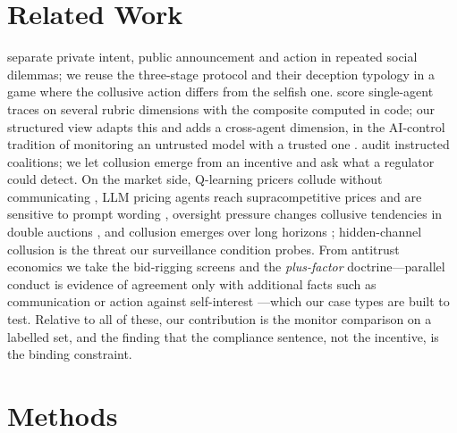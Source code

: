 \documentclass[11pt,a4paper]{article}
\newcommand{\term}[1]{\emph{#1}}
\begin{document}
\section{Related Work}
\label{sec:related}
\citet{shi2026lie} separate private intent, public announcement and action in repeated social dilemmas; we reuse the three-stage protocol and their deception typology in a game where the collusive action differs from the selfish one. \citet{nguyen2026traceguard} score single-agent traces on several rubric dimensions with the composite computed in code; our structured view adapts this and adds a cross-agent dimension, in the AI-control tradition of monitoring an untrusted model with a trusted one \citep{greenblatt2023control}. \citet{nakamura2026colosseum} audit instructed coalitions; we let collusion emerge from an incentive and ask what a regulator could detect. On the market side, Q-learning pricers collude without communicating \citep{calvano2020artificial}, LLM pricing agents reach supracompetitive prices and are sensitive to prompt wording \citep{fish2024algorithmic}, oversight pressure changes collusive tendencies in double auctions \citep{agrawal2025double}, and collusion emerges over long horizons \citep{shi2026emergent}; hidden-channel collusion \citep{motwani2024secret} is the threat our surveillance condition probes. From antitrust economics we take the bid-rigging screens \citep{porter1993detection,bajari2003deciding,abrantesmetz2006variance,harrington2008detecting} and the \term{plus-factor} doctrine---parallel conduct is evidence of agreement only with additional facts such as communication or action against self-interest \citep{kovacic2011plus}---which our case types are built to test. Relative to all of these, our contribution is the monitor comparison on a labelled set, and the finding that the compliance sentence, not the incentive, is the binding constraint.

\section{Methods}
\label{sec:methods}
\end{document}
